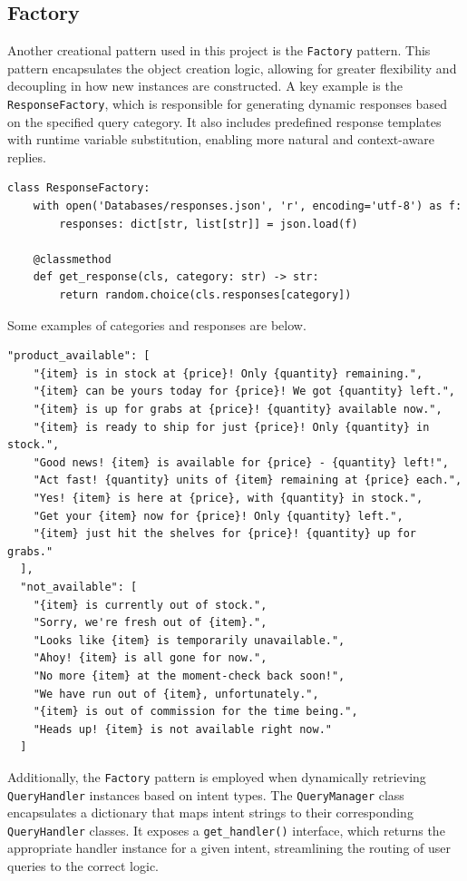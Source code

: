 \documentclass[11pt]{article}
\begin{document}
\subsection{Factory}
Another creational pattern used in this project is the \texttt{Factory} pattern. This pattern encapsulates the object creation logic, allowing for greater flexibility and decoupling in how new instances are constructed. A key example is the \texttt{ResponseFactory}, which is responsible for generating dynamic responses based on the specified query category. It also includes predefined response templates with runtime variable substitution, enabling more natural and context-aware replies.
\begin{lstlisting}
class ResponseFactory:
    with open('Databases/responses.json', 'r', encoding='utf-8') as f:
        responses: dict[str, list[str]] = json.load(f)

    @classmethod
    def get_response(cls, category: str) -> str:
        return random.choice(cls.responses[category])
\end{lstlisting}
%
Some examples of categories and responses are below.
%
\begin{lstlisting}
"product_available": [
    "{item} is in stock at {price}! Only {quantity} remaining.",
    "{item} can be yours today for {price}! We got {quantity} left.",
    "{item} is up for grabs at {price}! {quantity} available now.",
    "{item} is ready to ship for just {price}! Only {quantity} in stock.",
    "Good news! {item} is available for {price} - {quantity} left!",
    "Act fast! {quantity} units of {item} remaining at {price} each.",
    "Yes! {item} is here at {price}, with {quantity} in stock.",
    "Get your {item} now for {price}! Only {quantity} left.",
    "{item} just hit the shelves for {price}! {quantity} up for grabs."
  ],
  "not_available": [
    "{item} is currently out of stock.",
    "Sorry, we're fresh out of {item}.",
    "Looks like {item} is temporarily unavailable.",
    "Ahoy! {item} is all gone for now.",
    "No more {item} at the moment-check back soon!",
    "We have run out of {item}, unfortunately.",
    "{item} is out of commission for the time being.",
    "Heads up! {item} is not available right now."
  ]
\end{lstlisting}
%
Additionally, the \texttt{Factory} pattern is employed when dynamically retrieving \texttt{QueryHandler} instances based on intent types. The \texttt{QueryManager} class encapsulates a dictionary that maps intent strings to their corresponding \texttt{QueryHandler} classes. It exposes a \texttt{get\_handler()} interface, which returns the appropriate handler instance for a given intent, streamlining the routing of user queries to the correct logic.
\end{document}
